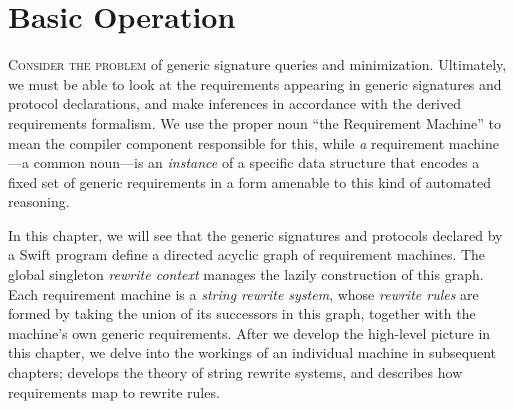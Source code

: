 \documentclass[../generics]{subfiles}
\begin{document}
\chapter{Basic Operation}\label{rqm basic operation}

\lettrine{C}{onsider the problem} of generic signature queries and minimization. Ultimately, we must be able to look at the requirements appearing in generic signatures and protocol declarations, and make inferences in accordance with the derived requirements formalism. We use the proper noun ``the Requirement Machine'' to mean the compiler component responsible for this, while \emph{a} requirement machine---a common noun---is an \emph{instance} of a specific data structure that encodes a fixed set of generic requirements in a form amenable to this kind of automated reasoning.

In this chapter, we will see that the generic signatures and protocols declared by a Swift program define a directed acyclic graph of requirement machines. The global singleton \emph{rewrite context} manages the lazily construction of this graph. Each requirement machine is a \emph{string rewrite system}, whose \emph{rewrite rules} are formed by taking the union of its successors in this graph, together with the machine's own generic requirements. After we develop the high-level picture in this chapter, we delve into the workings of an individual machine in subsequent chapters;  develops the theory of string rewrite systems, and  describes how requirements map to rewrite rules.

\smallskip
\end{document}
